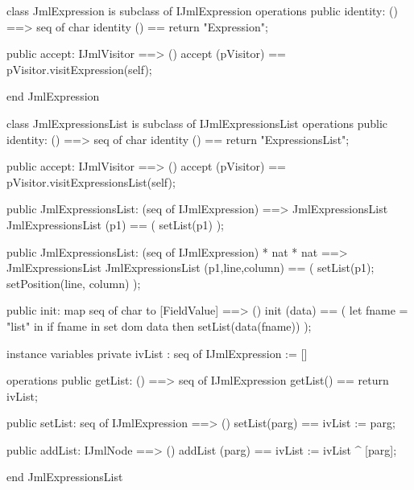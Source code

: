 \begin{vdm_al}
class JmlExpression is subclass of IJmlExpression
operations
  public identity: () ==> seq of char
  identity () == return "Expression";

  public accept: IJmlVisitor ==> ()
  accept (pVisitor) == pVisitor.visitExpression(self);

end JmlExpression
\end{vdm_al}
\begin{vdm_al}
class JmlExpressionsList is subclass of IJmlExpressionsList
operations
  public identity: () ==> seq of char
  identity () == return "ExpressionsList";

  public accept: IJmlVisitor ==> ()
  accept (pVisitor) == pVisitor.visitExpressionsList(self);

  public JmlExpressionsList:
    (seq of IJmlExpression) ==> JmlExpressionsList
  JmlExpressionsList (p1) == 
    ( setList(p1) );

  public JmlExpressionsList:
    (seq of IJmlExpression) *
    nat *
    nat ==> JmlExpressionsList
  JmlExpressionsList (p1,line,column) == 
    ( setList(p1);
      setPosition(line, column) );

  public init: map seq of char to [FieldValue] ==> ()
  init (data) ==
    ( let fname = "list" in
        if fname in set dom data
        then setList(data(fname)) );

instance variables
  private ivList : seq of IJmlExpression := []

operations
  public getList: () ==> seq of IJmlExpression
  getList() == return ivList;

  public setList: seq of IJmlExpression ==> ()
  setList(parg) == ivList := parg;

  public addList: IJmlNode ==> ()
  addList (parg) == ivList := ivList ^ [parg];

end JmlExpressionsList
\end{vdm_al}

